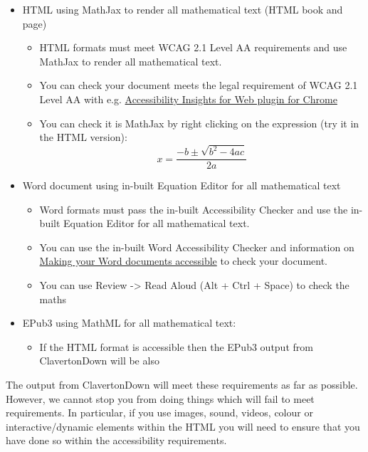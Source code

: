 \documentclass[12pt,english,a4paper]{extarticle}
\providecommand{\tightlist}{%
  \setlength{\itemsep}{0pt}\setlength{\parskip}{0pt}}
\theoremstyle{plain}
\theoremstyle{plain}
\theoremstyle{plain}
\theoremstyle{plain}
\theoremstyle{plain}
\theoremstyle{definition}
\theoremstyle{definition}
\theoremstyle{definition}
\theoremstyle{remark}
\theoremstyle{remark}
\renewcommand{\;}{\,}
\begin{document}
\begin{itemize}
\tightlist
\item
  HTML using MathJax to render all mathematical text (HTML book and page)

  \begin{itemize}
  \tightlist
  \item
    HTML formats must meet WCAG 2.1 Level AA requirements and use MathJax to render all mathematical text.
  \item
    You can check your document meets the legal requirement of WCAG 2.1 Level AA with e.g. \href{https://accessibilityinsights.io/docs/en/web/overview}{Accessibility Insights for Web plugin for Chrome}
  \item
    You can check it is MathJax by right clicking on the expression (try it in the HTML version):
    \[x = \frac{-b\pm\sqrt{b^2 - 4ac}}{2a}\]
  \end{itemize}
\item
  Word document using in-built Equation Editor for all mathematical text

  \begin{itemize}
  \tightlist
  \item
    Word formats must pass the in-built Accessibility Checker and use the in-built Equation Editor for all mathematical text.
  \item
    You can use the in-built Word Accessibility Checker and information on \href{https://support.office.com/en-gb/article/make-your-word-documents-accessible-to-people-with-disabilities-d9bf3683-87ac-47ea-b91a-78dcacb3c66d}{Making your Word documents accessible} to check your document.
  \item
    You can use Review -\textgreater{} Read Aloud (Alt + Ctrl + Space) to check the maths
  \end{itemize}
\item
  EPub3 using MathML for all mathematical text:

  \begin{itemize}
  \tightlist
  \item
    If the HTML format is accessible then the EPub3 output from ClavertonDown will be also
  \end{itemize}
\end{itemize}

The output from ClavertonDown will meet these requirements as far as possible. However, we cannot stop you from doing things which will fail to meet requirements. In particular, if you use images, sound, videos, colour or interactive/dynamic elements within the HTML you will need to ensure that you have done so within the accessibility requirements.
\end{document}
